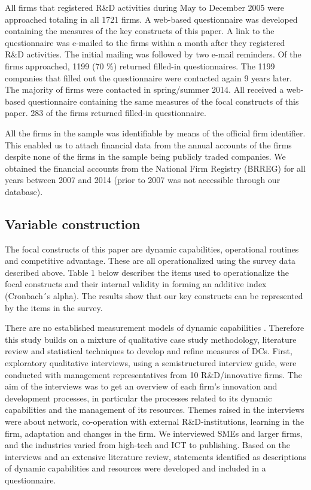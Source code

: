 \documentclass[review,fleqn]{elsarticle}\usepackage[]{graphicx}\usepackage[]{color}
\begin{document}
All firms that registered R\&D activities during May to December 2005 were approached
totaling in all 1721 firms. A web-based questionnaire was developed containing the
measures of the key constructs of this paper. A link to the questionnaire was e-mailed to
the firms within a month after they registered R\&D activities. The initial mailing was
followed by two e-mail reminders. Of the firms approached, 1199 (70 \%) returned filled-in
questionnaires. The 1199 companies that filled out the questionnaire were contacted again
9 years later. The majority of firms were contacted in spring/summer 2014. All received a
web-based questionnaire containing the same measures of the focal constructs of this
paper. 283 of the firms returned filled-in questionnaire.

All the firms in the sample was identifiable by means of the official firm
identifier. This enabled us to attach financial data from the annual accounts of the firms
despite none of the firms in the sample being publicly traded companies. We obtained the
financial accounts from the National Firm Registry (BRREG) for all years between 2007 and
2014 (prior to 2007 was not accessible through our database).

\subsection{Variable construction}

The focal constructs of this paper are dynamic capabilities, operational routines and
competitive advantage. These are all operationalized using the survey data described
above. Table 1 below describes the items used to operationalize the focal constructs and
their internal validity in forming an additive index (Cronbach´s alpha). The results show
that our key constructs can be represented by the items in the survey.


There are no established measurement models of dynamic capabilities
\citep{McKelvie2009,Schilke2018}. Therefore this study builds on a mixture of qualitative
case study methodology, literature review and statistical techniques to develop and refine
measures of DCs. First, exploratory qualitative interviews, using a semistructured
interview guide, were conducted with management representatives from 10 R\&D/innovative
firms. The aim of the interviews was to get an overview of each firm's innovation and
development processes, in particular the processes related to its dynamic capabilities and
the management of its resources. Themes raised in the interviews were about network,
co-operation with external R\&D-institutions, learning in the firm, adaptation and changes
in the firm. We interviewed SMEs and larger firms, and the industries varied from
high-tech and ICT to publishing.  Based on the interviews and an extensive literature
review, statements identified as descriptions of dynamic capabilities and resources were
developed and included in a questionnaire.
\end{document}

